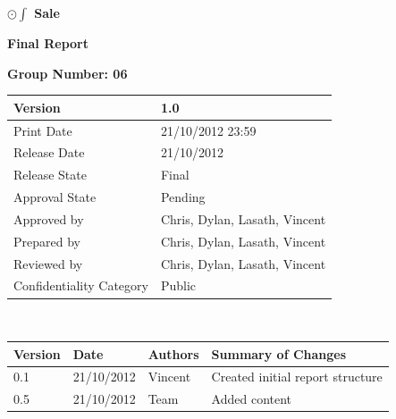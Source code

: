 \documentclass[a4paper]{article}
\begin{document}
\thispagestyle{empty}      %
\begin{center}
\Large\textbf{$\odot\int$ Sale} %

\Large\textbf{Final Report}

\bigskip\large\textbf{Group Number: 06}
\end{center}

\vspace*{16.5cm}
\begin{tabular}{|l|l|}
  \hline
  Version         & 1.0\\\hline
  Print Date      & 21/10/2012 23:59\\\hline
  Release Date    & 21/10/2012\\\hline
  Release State   & Final\\\hline
  Approval State  & Pending\\\hline
  Approved by     & Chris, Dylan, Lasath, Vincent\\\hline
  Prepared by     & Chris, Dylan, Lasath, Vincent\\\hline
  Reviewed by     & Chris, Dylan, Lasath, Vincent\\\hline
  Confidentiality Category  & Public\\\hline
\end{tabular}
\pagebreak

\thispagestyle{plain}     %
\setcounter{page}{1}      %
\renewcommand{\thepage}{\roman{page}}  %

\\[2ex]
\begin{tabular}{|l|l|l|l|}
  \hline
  Version & Date & Authors & Summary of Changes\\\hline\hline
  0.1 & 21/10/2012     &    Vincent     &    Created initial report structure              \\\hline
  0.5 & 21/10/2012     &    Team     &    Added content               \\\hline
 
\end{tabular}

\pagebreak

\end{document}
